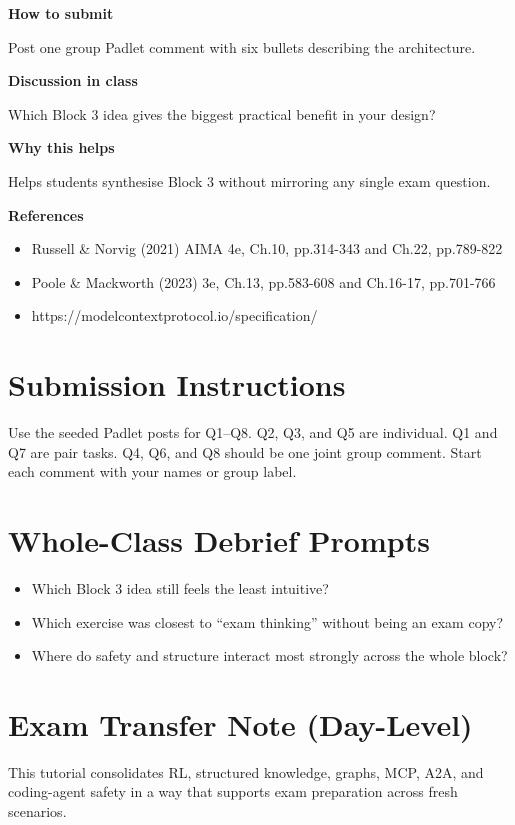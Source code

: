 \documentclass[11pt]{article}
\providecommand{\tightlist}{\setlength{\itemsep}{0pt}\setlength{\parskip}{0pt}}
\begin{document}
\begin{tcolorbox}[colback=white,colframe=MidnightBlue,title={Q8 Stretch Synthesis},fonttitle=\bfseries,breakable]
{\large\bfseries\color{MidnightBlue} How to submit}\par\medskip
Post one group Padlet comment with six bullets describing the architecture.

{\large\bfseries\color{MidnightBlue} Discussion in class}\par\medskip
Which Block 3 idea gives the biggest practical benefit in your design?

{\large\bfseries\color{MidnightBlue} Why this helps}\par\medskip
Helps students synthesise Block 3 without mirroring any single exam question.

{\large\bfseries\color{MidnightBlue} References}\par\medskip
\begin{itemize}\item Russell \& Norvig (2021) AIMA 4e, Ch.10, pp.314-343 and Ch.22, pp.789-822
\item Poole \& Mackworth (2023) 3e, Ch.13, pp.583-608 and Ch.16-17, pp.701-766
\item https://modelcontextprotocol.io/specification/\end{itemize}
\end{tcolorbox}

\section*{Submission Instructions}

Use the seeded Padlet posts for Q1--Q8. Q2, Q3, and Q5 are individual. Q1 and Q7 are pair tasks. Q4, Q6, and Q8 should be one joint group comment. Start each comment with your names or group label.

\section*{Whole-Class Debrief Prompts}

\begin{itemize}
\tightlist
\item
  Which Block 3 idea still feels the least intuitive?
\item
  Which exercise was closest to ``exam thinking'' without being an exam copy?
\item
  Where do safety and structure interact most strongly across the whole block?
\end{itemize}

\section*{Exam Transfer Note (Day-Level)}

This tutorial consolidates RL, structured knowledge, graphs, MCP, A2A, and coding-agent safety in a way that supports exam preparation across fresh scenarios.
\end{document}
